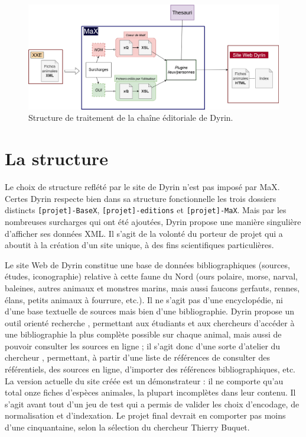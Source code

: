 \documentclass[a4paper,12pt,twoside]{book}
\begin{document}
\begin{figure}[H]
    \centering
    \includegraphics[width=\linewidth]{img/partie_3/schema.png}
    \caption{Structure de traitement de la chaîne éditoriale de Dyrin.}
    \label{structure}
\end{figure}

\section{La structure}
Le choix de structure reflété par le site de Dyrin n'est pas imposé par MaX. Certes Dyrin respecte bien dans sa structure fonctionnelle les trois dossiers distincts \texttt{[projet]-BaseX}, \texttt{[projet]-editions} et \texttt{[projet]-MaX}. Mais par les nombreuses surcharges qui ont été ajoutées, Dyrin propose une manière singulière d'afficher ses données XML. Il s'agit de la volonté du porteur de projet qui a aboutit à la création d'un site unique, à des fins scientifiques particulières. 

Le site Web de Dyrin constitue une base de données bibliographiques (sources, études, iconographie) relative à cette faune du Nord (ours polaire, morse, narval, baleines, autres animaux et monstres marins, mais aussi faucons gerfauts, rennes, élans, petits animaux à fourrure, etc.). Il ne s'agit pas d'une encyclopédie, ni d'une base textuelle de sources mais bien d'une bibliographie. Dyrin propose un outil orienté \og recherche \fg, permettant aux étudiants et aux chercheurs d'accéder à une bibliographie la plus complète possible sur chaque animal, mais aussi de pouvoir consulter les sources en ligne ; il s'agit donc d'une sorte d'\og atelier du chercheur \fg, permettant, à partir d'une liste de références de consulter des référentiels, des sources en ligne, d'importer des références bibliographiques, etc. La version actuelle du site créée est un démonstrateur : il ne comporte qu'au total onze fiches d'espèces animales, la plupart incomplètes dans leur contenu. Il s'agit avant tout d'un jeu de test qui a permis de valider les choix d'encodage, de normalisation et d'indexation. Le projet final devrait en comporter pas moins d'une cinquantaine, selon la sélection du chercheur Thierry Buquet.
\end{document}
